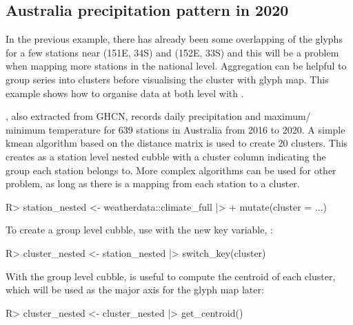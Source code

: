 \documentclass[
]{jss}
\begin{document}
\hypertarget{australia-precipitation-pattern-in-2020}{%
\subsection{Australia precipitation pattern in
2020}\label{australia-precipitation-pattern-in-2020}}

In the previous example, there has already been some overlapping of the
glyphs for a few stations near (151E, 34S) and (152E, 33S) and this will
be a problem when mapping more stations in the national level.
Aggregation can be helpful to group series into clusters before
visualising the cluster with glyph map. This example shows how to
organise data at both level with .

, also extracted from GHCN, records
daily precipitation and maximum/ minimum temperature for 639 stations in
Australia from 2016 to 2020. A simple kmean algorithm based on the
distance matrix is used to create 20 clusters. This creates
 as a station level nested cubble with a cluster
column indicating the group each station belongs to. More complex
algorithms can be used for other problem, as long as there is a mapping
from each station to a cluster.

\begin{CodeChunk}
\begin{CodeInput}
R> station_nested <- weatherdata::climate_full |> 
+   mutate(cluster = ...)
\end{CodeInput}
\end{CodeChunk}

To create a group level cubble, use  with the new key
variable, :

\begin{CodeChunk}
\begin{CodeInput}
R> cluster_nested <- station_nested |> switch_key(cluster) 
\end{CodeInput}
\end{CodeChunk}

With the group level cubble,  is useful to compute
the centroid of each cluster, which will be used as the major axis for
the glyph map later:

\begin{CodeChunk}
\begin{CodeInput}
R> cluster_nested <- cluster_nested |> get_centroid()
\end{CodeInput}
\end{CodeChunk}
\end{document}
